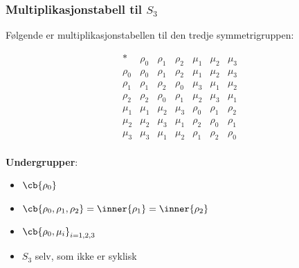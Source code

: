 \subsubsection{Multiplikasjonstabell til $S_3$}
Følgende er multiplikasjonstabellen til den tredje symmetrigruppen:

\[
	\begin{array}{c||cccccc}
		*      & \rho_0 & \rho_1 & \rho_2 & \mu_1 & \mu_2 & \mu_3 \\
		\hline\hline
		\rho_0 & \rho_0 & \rho_1 & \rho_2 & \mu_1 & \mu_2 & \mu_3 \\
		\rho_1 & \rho_1 & \rho_2 & \rho_0 & \mu_3 & \mu_1 & \mu_2 \\
		\rho_2 & \rho_2 & \rho_0 & \rho_1 & \mu_2 & \mu_3 & \mu_1 \\
		\mu_1  & \mu_1 & \mu_2 & \mu_3 & \rho_0 & \rho_1 & \rho_2 \\
		\mu_2  & \mu_2 & \mu_3 & \mu_1 & \rho_2 & \rho_0 & \rho_1 \\
		\mu_3  & \mu_3 & \mu_1 & \mu_2 & \rho_1 & \rho_2 & \rho_0 \\
	\end{array}
\]

\textbf{Undergrupper}:
\begin{itemize}
  \item $\cb{\rho_0}$
  \item $\cb{\rho_0, \rho_1, \rho_2}=\inner{\rho_1}=\inner{\rho_2}$
  \item $\cb{\rho_0, \mu_i}_{i=1,2,3}$
  \item $S_3$ selv, som ikke er syklisk
\end{itemize}
